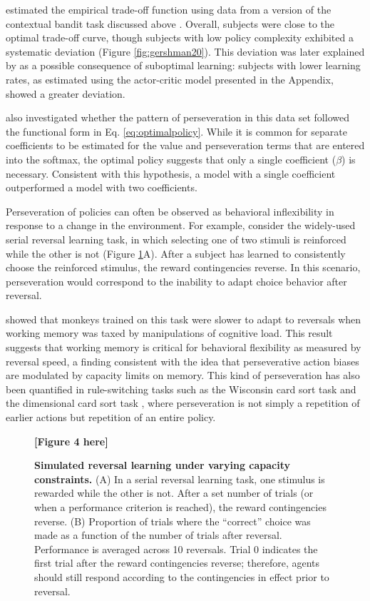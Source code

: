 \documentclass[11pt]{article}
\begin{document}
\citet{gershman20} estimated the empirical trade-off function using data from a version of the contextual bandit task discussed above \citep{collins18}. Overall, subjects were close to the optimal trade-off curve, though subjects with low policy complexity exhibited a systematic deviation (Figure \ref{fig:gershman20}). This deviation was later explained by \citet{gershmanlai20} as a possible consequence of suboptimal learning: subjects with lower learning rates, as estimated using the actor-critic model presented in the Appendix, showed a greater deviation.

\citet{gershman20} also investigated whether the pattern of perseveration in this data set followed the functional form in Eq. \ref{eq:optimalpolicy}. While it is common for separate coefficients to be estimated for the value and perseveration terms that are entered into the softmax, the optimal policy suggests that only a single coefficient ($\beta$) is necessary. Consistent with this hypothesis, a model with a single coefficient outperformed a model with two coefficients. 

Perseveration of policies can often be observed as behavioral inflexibility in response to a change in the environment. For example, consider the widely-used serial reversal learning task, in which selecting one of two stimuli is reinforced while the other is not (Figure \ref{fig:reversal}A). After a subject has learned to consistently choose the reinforced stimulus, the reward contingencies reverse. In this scenario, perseveration would correspond to the inability to adapt choice behavior after reversal. 

\cite{Hassett2017-dv} showed that monkeys trained on this task were slower to adapt to reversals when working memory was taxed by manipulations of cognitive load. This result suggests that working memory is critical for behavioral flexibility as measured by reversal speed, a finding consistent with the idea that perseverative action biases are modulated by capacity limits on memory. This kind of perseveration has also been quantified in rule-switching tasks such as the Wisconsin card sort task \citep{Berg1948-bi} and the dimensional card sort task \citep{Zelazo2006-kj}, where perseveration is not simply a repetition of earlier actions but repetition of an entire policy.

\begin{figure}
    \centering
    \textbf{[Figure 4 here]}
    \caption{\textbf{Simulated reversal learning under varying capacity constraints.} (A) In a serial reversal learning task, one stimulus is rewarded while the other is not. After a set number of trials (or when a performance criterion is reached), the reward contingencies reverse. (B) Proportion of trials where the ``correct'' choice was made as a function of the number of trials after reversal. Performance is averaged across 10 reversals. Trial 0 indicates the first trial after the reward contingencies reverse; therefore, agents should still respond according to the contingencies in effect prior to reversal.}
    \label{fig:reversal}
\end{figure}
\end{document}
